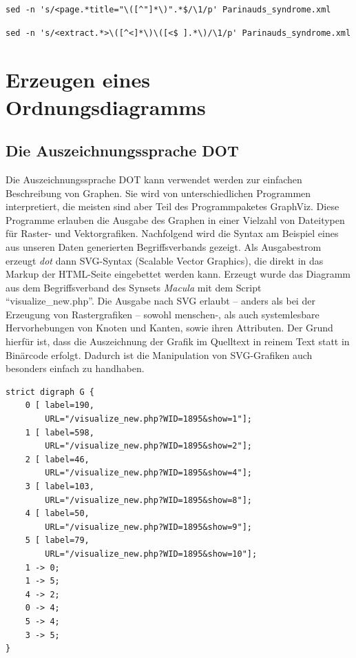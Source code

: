 \documentclass[pagesize,paper=A4,DIV=calc,fontsize=12pt,draft=false]{scrreprt}
\begin{document}
\begin{lstlisting}[caption={Extraktion des Titels aus Zeile 5 des Artikels \enquote{Parinaud's syndrome}. HTML-Entities wie \texttt{\&\#39;} für hochgestellte einzelne Anführungszeichen in Zeile 5 wurden gesammelt und in der Ergebnisdatei ersetzt.},label=list:gettitle]
sed -n 's/<page.*title="\([^"]*\)".*$/\1/p' Parinauds_syndrome.xml
\end{lstlisting}

\begin{lstlisting}[caption={Extraktion des Textes aus der der Zeile 10 nachfolgenden Zeile des Artikels \enquote{Parinaud's syndrome}},label=list:gettext]
sed -n 's/<extract.*>\([^<]*\)\([<$ ].*\)/\1/p' Parinauds_syndrome.xml
\end{lstlisting}

\section{Erzeugen eines Ordnungsdiagramms}

\subsection{Die Auszeichnungssprache DOT}

Die Auszeichnungssprache DOT kann verwendet werden zur einfachen Beschreibung von Graphen.
Sie wird von unterschiedlichen Programmen interpretiert, die meisten sind aber Teil des Programmpaketes GraphViz.
Diese Programme erlauben die Ausgabe des Graphen in einer Vielzahl von Dateitypen für Raster- und Vektorgrafiken.
Nachfolgend wird die Syntax am Beispiel eines aus unseren Daten generierten Begriffsverbands gezeigt.
Als Ausgabestrom erzeugt \emph{dot} dann SVG-Syntax (Scalable Vector Graphics), die direkt in das Markup der HTML-Seite eingebettet werden kann.
Erzeugt wurde das Diagramm aus dem Begriffsverband des Synsets \emph{Macula} mit dem Script \enquote{visualize\_new.php}. 
Die Ausgabe nach SVG erlaubt -- anders als bei der Erzeugung von Rastergrafiken -- sowohl menschen-, als auch systemlesbare Hervorhebungen von Knoten und Kanten, sowie ihren Attributen.
Der Grund hierfür ist, dass die Auszeichnung der Grafik im Quelltext in reinem Text statt in Binärcode erfolgt. 
Dadurch ist die Manipulation von SVG-Grafiken auch besonders einfach zu handhaben.

\lstset{
language=C
}

\begin{lstlisting}[caption={DOT-Syntax für Ordnungsdiagramm des Begriffsverbands für das Synset \emph{Macula}. Vereinfachte Darstellung.}]
strict digraph G {
    0 [ label=190, 
        URL="/visualize_new.php?WID=1895&show=1"];
    1 [ label=598, 
        URL="/visualize_new.php?WID=1895&show=2"];
    2 [ label=46, 
        URL="/visualize_new.php?WID=1895&show=4"];
    3 [ label=103, 
        URL="/visualize_new.php?WID=1895&show=8"];
    4 [ label=50, 
        URL="/visualize_new.php?WID=1895&show=9"];
    5 [ label=79, 
        URL="/visualize_new.php?WID=1895&show=10"];
    1 -> 0;
    1 -> 5;
    4 -> 2;
    0 -> 4;
    5 -> 4;
    3 -> 5;
}
\end{lstlisting}
\end{document}
